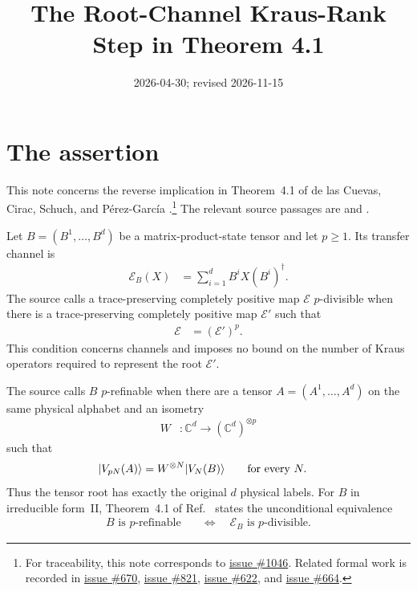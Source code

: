 \documentclass{article}
\title{The Root-Channel Kraus-Rank Step in Theorem 4.1}
\author{}
\date{2026-04-30; revised 2026-11-15}
\begin{document}
\maketitle
{}

\section{The assertion}

This note concerns the reverse implication in Theorem~4.1 of de las Cuevas,
Cirac, Schuch, and P\'erez-Garc\'ia
\cite[Theorem~4.1]{DeLasCuevas2017Irreducible}.\footnote{For traceability, this
note corresponds to
\href{https://github.com/LionSR/TNLean/issues/1046}{issue \#1046}. Related
formal work is recorded in
\href{https://github.com/LionSR/TNLean/issues/670}{issue \#670},
\href{https://github.com/LionSR/TNLean/issues/821}{issue \#821},
\href{https://github.com/LionSR/TNLean/issues/622}{issue \#622}, and
\href{https://github.com/LionSR/TNLean/issues/664}{issue \#664}.} The relevant
source passages are
 and
.

Let $B=(B^1,\ldots,B^d)$ be a matrix-product-state tensor and let $p\geq 1$.
Its transfer channel is
\begin{align}
    \mathcal E_B(X)
    &=\sum_{i=1}^d B^iX(B^i)^\dagger.
    \label{eq:dccsp17_root_kraus_rank_thm41_transfer_channel}
\end{align}
The source calls a trace-preserving completely positive map $\mathcal E$
$p$-divisible when there is a trace-preserving completely positive map
$\mathcal E'$ such that
\begin{align}
    \mathcal E
    &=(\mathcal E')^p.
    \label{eq:dccsp17_root_kraus_rank_thm41_channel_divisibility}
\end{align}
This condition concerns channels and imposes no bound on the number of Kraus
operators required to represent the root $\mathcal E'$.

The source calls $B$ $p$-refinable when there are a tensor
$A=(A^1,\ldots,A^d)$ on the same physical alphabet and an isometry
\begin{align}
    W
    &:\mathbb C^d\longrightarrow(\mathbb C^d)^{\otimes p}
    \label{eq:dccsp17_root_kraus_rank_thm41_refinement_isometry}
\end{align}
such that
\begin{align}
    |V_{pN}(A)\rangle
    &=W^{\otimes N}|V_N(B)\rangle
    \qquad\text{for every }N.
    \label{eq:dccsp17_root_kraus_rank_thm41_refinement_identity}
\end{align}
Thus the tensor root has exactly the original $d$ physical labels. For $B$ in
irreducible form~II, Theorem~4.1 of
Ref.~\cite{DeLasCuevas2017Irreducible} states the unconditional equivalence
\begin{align}
    B\text{ is }p\text{-refinable}
    \quad&\Longleftrightarrow\quad
    \mathcal E_B\text{ is }p\text{-divisible}.
    \label{eq:dccsp17_root_kraus_rank_thm41_source_equivalence}
\end{align}
\end{document}
